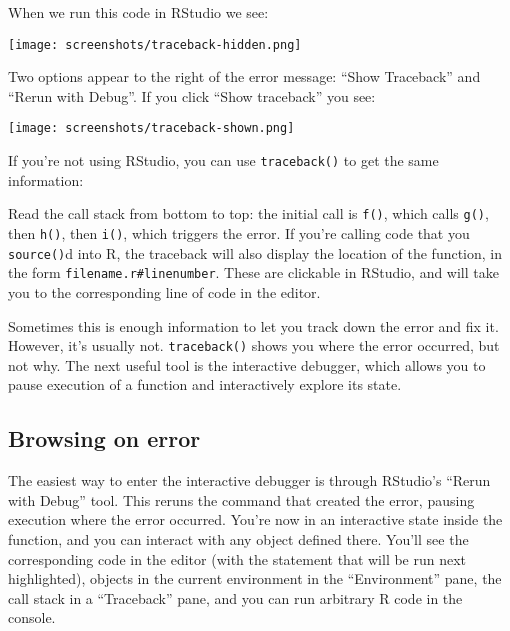 When we run this code in RStudio we see:

\texttt{[image: screenshots/traceback-hidden.png]}

Two options appear to the right of the error message: ``Show Traceback''
and ``Rerun with Debug''. If you click ``Show traceback'' you see:

\texttt{[image: screenshots/traceback-shown.png]}

If you're not using RStudio, you can use \texttt{traceback()} to get the
same information:

\begin{Shaded}
\begin{Highlighting}[]
\NormalTok{()}
\end{Highlighting}
\end{Shaded}

Read the call stack from bottom to top: the initial call is
\texttt{f()}, which calls \texttt{g()}, then \texttt{h()}, then
\texttt{i()}, which triggers the error. If you're calling code that you
\texttt{source()}d into R, the traceback will also display the location
of the function, in the form \texttt{filename.r\#linenumber}. These are
clickable in RStudio, and will take you to the corresponding line of
code in the editor.

Sometimes this is enough information to let you track down the error and
fix it. However, it's usually not. \texttt{traceback()} shows you where
the error occurred, but not why. The next useful tool is the interactive
debugger, which allows you to pause execution of a function and
interactively explore its state.

\hypertarget{browsing-on-error}{%
\subsection{Browsing on error}\label{browsing-on-error}}

The easiest way to enter the interactive debugger is through RStudio's
``Rerun with Debug'' tool. This reruns the command that created the
error, pausing execution where the error occurred. You're now in an
interactive state inside the function, and you can interact with any
object defined there. You'll see the corresponding code in the editor
(with the statement that will be run next highlighted), objects in the
current environment in the ``Environment'' pane, the call stack in a
``Traceback'' pane, and you can run arbitrary R code in the console.

